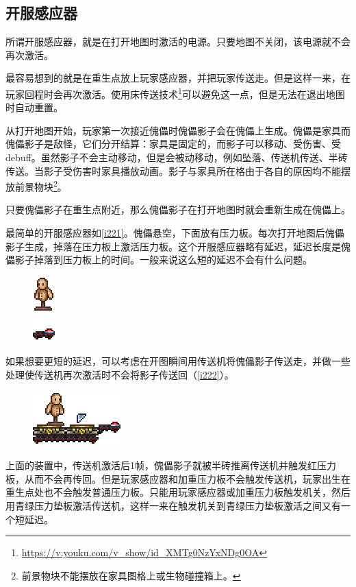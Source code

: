 \subsection{开服感应器}
所谓开服感应器，就是在打开地图时激活的电源。只要地图不关闭，该电源就不会再次激活。

最容易想到的就是在重生点放上玩家感应器，并把玩家传送走。但是这样一来，在玩家回程时会再次激活。使用床传送技术\footnote{\url{https://v.youku.com/v_show/id_XMTg0NzYxNDg0OA}}可以避免这一点，但是无法在退出地图时自动重置。

从打开地图开始，玩家第一次接近傀儡时傀儡影子会在傀儡上生成。傀儡是家具而傀儡影子是敌怪，它们分开结算：家具是固定的，而影子可以移动、受伤害、受debuff。虽然影子不会主动移动，但是会被动移动，例如坠落、传送机传送、半砖传送。当影子受伤害时家具播放动画。影子与家具所在格由于各自的原因均不能摆放前景物块\footnote{前景物块不能摆放在家具图格上或生物碰撞箱上。}。

只要傀儡影子在重生点附近，那么傀儡影子在打开地图时就会重新生成在傀儡上。

最简单的开服感应器如\autoref{i221}。傀儡悬空，下面放有压力板。每次打开地图后傀儡影子生成，掉落在压力板上激活压力板。这个开服感应器略有延迟，延迟长度是傀儡影子掉落到压力板上的时间。一般来说这么短的延迟不会有什么问题。

\begin{figure}[!h]
\centering
\includegraphics{images/221.png}
\caption{}
\label{i221}
\end{figure}

如果想要更短的延迟，可以考虑在开图瞬间用传送机将傀儡影子传送走，并做一些处理使传送机再次激活时不会将影子传送回（\autoref{i222}）。

\begin{figure}[!h]
\centering
\includegraphics{images/222.png}
\caption{}
\label{i222}
\end{figure}

上面的装置中，传送机激活后1帧，傀儡影子就被半砖推离传送机并触发红压力板，从而不会再传回。但是玩家感应器和加重压力板不会触发传送机，玩家出生在重生点处也不会触发普通压力板。只能用玩家感应器或加重压力板触发机关，然后用青绿压力垫板激活传送机，这样一来在触发机关到青绿压力垫板激活之间又有一个短延迟。

